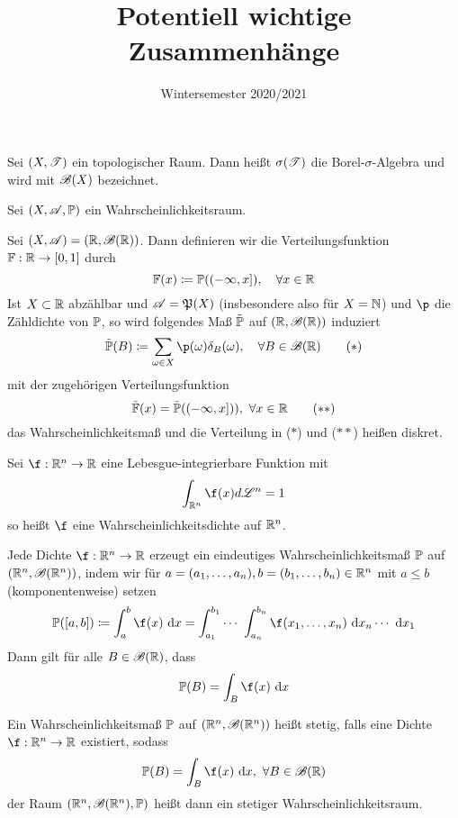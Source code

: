 \documentclass{scrartcl}
\title{Potentiell wichtige Zusammenhänge}
\date{Wintersemester 2020/2021}
\author{}
\begin{document}
    \maketitle
    \begin{defn}
        Sei $(X,\cali{T})$ ein topologischer Raum. Dann heißt $\sigma(\cali{T})$ die Borel-$\sigma$-Algebra und wird mit $\cali{B}(X)$ bezeichnet.
    \end{defn}
    Sei $(X,\cali{A},\P)$ ein Wahrscheinlichkeitsraum. 
    \begin{defn}[Verteilung] Sei $(X,\cali{A})=(\R,\cali{B}(\R))$. Dann definieren wir die 
        Verteilungsfunktion $\F:\R\to [0,1]$ durch 
        \[
        \F(x) \coloneqq \P((-\infty,x]), \quad \forall x\in \R    
        \]
    Ist $X\subset \R$ abzählbar und $\cali{A}=\mathfrak{P}(X)$ (insbesondere also für $X=\N$) und $\p$ die Zähldichte von $\P$,
    so wird folgendes Maß $\Tilde{\P}$ auf $(\R,\cali{B}(\R))$ induziert 
    \[
        \Tilde{\P}(B) \coloneqq \sum_{\omega \in X} \p(\omega) \delta_B(\omega), \quad \forall B\in \cali{B}(\R) \tag{$*$}
    \]
    mit der zugehörigen Verteilungsfunktion
    \[
    \Tilde{\F}(x) = \tilde{\P}((-\infty,x])), \ \forall x\in \R   \tag{$**$} 
    \]
    das Wahrscheinlichkeitsmaß und die Verteilung in ($*$) und ($**$) heißen diskret.
    \end{defn}
    \begin{defn}[Wahrscheinlichkeitsdichte] Sei $\f:\R^n\to \R$ eine Lebesgue-integrierbare Funktion mit 
        \[
            \int_{\R^n} \f(x) d\cali{L}^n = 1
        \]
        so heißt $\f$ eine Wahrscheinlichkeitsdichte auf $\R^n$.
    \end{defn}
    \begin{satz} Jede Dichte $\f:\R^n\to \R$ erzeugt ein eindeutiges Wahrscheinlichkeitsmaß $\P$ auf $(\R^n,\cali{B}(\R^n))$, indem wir für $a=(a_1,\ldots,a_n), b=(b_1,\ldots,b_n)\in \R^n$ mit $a\le b$ (komponentenweise) setzen
        \[
        \P([a,b]) \coloneqq \int_a^b \f(x) \ \D x = \int_{a_1}^{b_1} \cdots \ \int_{a_n}^{b_n} \f(x_1,\ldots,x_n) \ \D x_n \cdots \ \D x_1
        \]Dann gilt für alle $B\in \cali{B}(\R)$, dass \[\P(B)=\int_B \f(x)\ \D x\]
    \end{satz}
    \begin{defn}
        Ein Wahrscheinlichkeitsmaß $\P$ auf $(\R^n,\cali{B}(\R^n))$ heißt stetig, falls eine Dichte $\f:\R^n\to\R$ existiert, sodass 
        \[
        \P(B) = \int_B \f(x) \ \D x, \ \forall B\in\cali{B}(\R)    
        \]
        der Raum $(\R^n,\cali{B}(\R^n),\P)$ heißt dann ein stetiger Wahrscheinlichkeitsraum.
    \end{defn}
\end{document}
